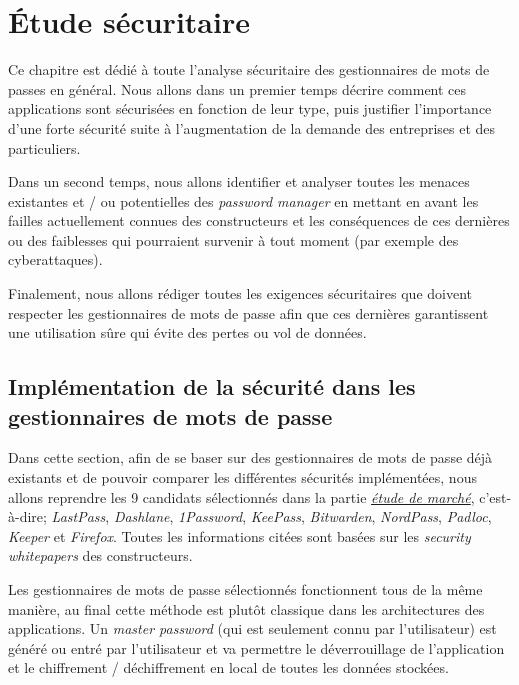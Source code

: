 
\chapter{Étude sécuritaire}
\label{ch:etude_secu}

Ce chapitre est dédié à toute l'analyse sécuritaire des gestionnaires de mots de passes en général. Nous allons dans un premier temps décrire comment ces applications sont sécurisées en fonction de leur type, puis justifier l'importance d'une forte sécurité suite à l'augmentation de la demande des entreprises et des particuliers.

Dans un second temps, nous allons identifier et analyser toutes les menaces existantes et / ou potentielles des \textit{password manager} en mettant en avant les failles actuellement connues des constructeurs et les conséquences de ces dernières ou des faiblesses qui pourraient survenir à tout moment (par exemple des cyberattaques).

Finalement, nous allons rédiger toutes les exigences sécuritaires que doivent respecter les gestionnaires de mots de passe afin que ces dernières garantissent une utilisation sûre qui évite des pertes ou vol de données.

\section{Implémentation de la sécurité dans les gestionnaires de mots de passe}

Dans cette section, afin de se baser sur des gestionnaires de mots de passe déjà existants et de pouvoir comparer les différentes sécurités implémentées, nous allons reprendre les 9 candidats sélectionnés dans la partie \hyperref[ch:etude_marche]{\textit{étude de marché}}, c'est-à-dire; \textit{LastPass}, \textit{Dashlane}, \textit{1Password}, \textit{KeePass}, \textit{Bitwarden}, \textit{NordPass}, \textit{Padloc}, \textit{Keeper} et \textit{Firefox}. Toutes les informations citées sont basées sur les \textit{security whitepapers} des constructeurs\cite{lastpasssecurity}\cite{dashlanesecurity}\cite{1passwordsecurity}\cite{keepasssecurity}\cite{bitwardensecurity}\cite{padlocsecurity}\cite{keepersecurity}.

Les gestionnaires de mots de passe sélectionnés fonctionnent tous de la même manière, au final cette méthode est plutôt classique dans les architectures des applications. Un \textit{master password} (qui est seulement connu par l'utilisateur) est généré ou entré par l'utilisateur et va permettre le déverrouillage de l'application et le chiffrement / déchiffrement en local de toutes les données stockées. 

